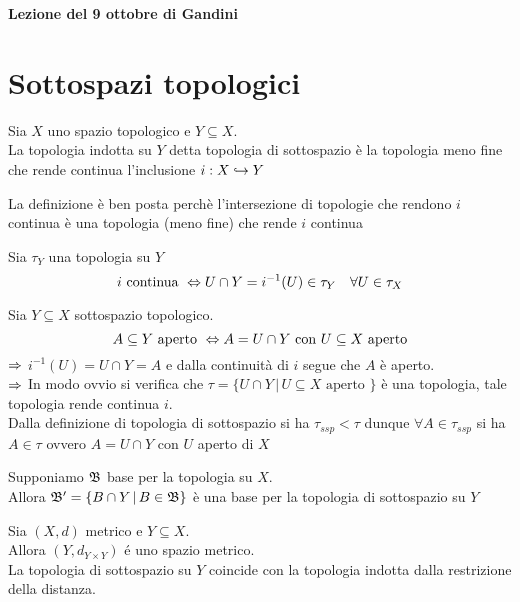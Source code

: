 

\textbf{Lezione del 9 ottobre di Gandini}
\section{Sottospazi topologici}

\begin{defn}\bianco
Sia $X$ uno spazio topologico e $Y \subseteq X$.\\
La topologia indotta su $Y$ detta topologia di sottospazio \`e la topologia meno fine che rende continua l'inclusione $i :X \hookrightarrow Y $
\begin{oss}La definizione \`e ben posta perch\`e l'intersezione di topologie che rendono $i$ continua \`e una topologia (meno fine) che rende $i$ continua
\end{oss}
\end{defn}
\begin{oss}Sia $\tau_Y$ una topologia su $Y$
$$ i \text{ continua } \Leftrightarrow U\cap Y = i^{-1}(U) \in \tau_Y \quad \forall U\in \tau_X$$
\end{oss}
\begin{prop}Sia $Y \subseteq X $ sottospazio topologico.
$$ A \subseteq Y \text{ aperto } \Leftrightarrow A=U \cap Y \text{ con } U \subseteq X \text{ aperto} $$
\proof $\Rightarrow$  $i^{-1}(U)=U \cap Y =A $ e dalla continuit\`a di $i$ segue che $A$ \`e aperto.\\
$\Rightarrow$ In modo ovvio si verifica che $\tau=\{ U \cap Y \, \vert \, U \subseteq X \text{ aperto }\}$ \`e una topologia, tale topologia rende continua $i$.\\
Dalla definizione di topologia di sottospazio si ha $\tau_{ssp}< \tau$ dunque $\forall A \in \tau_{ssp}$ si ha $A \in \tau$ ovvero $A=U\cap Y$ con $U$ aperto di $X$
\endproof
\end{prop}
\begin{oss}\label{base_sott}Supponiamo $\mathfrak{B}$ base per la topologia su $X$.\\
Allora $\mathfrak{B}'=\{ B \cap Y \, \vert \, B \in \mathfrak{B} \}$ \`e una base per la topologia di sottospazio su $Y$
\end{oss}
\begin{prop}Sia $(X,d)$ metrico e $Y \subseteq X$.\\
Allora $\left( Y, d_{Y \times Y } \right)$ \'e uno spazio metrico.\\
La topologia di sottospazio su $Y$ coincide con la topologia indotta dalla restrizione della distanza.
\end{prop}
